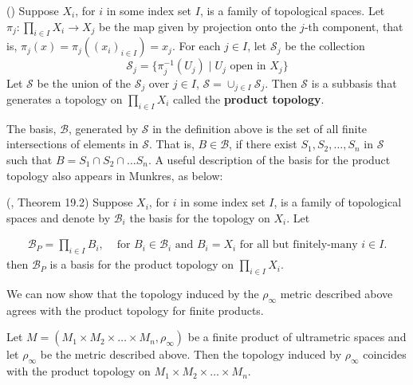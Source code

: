 \begin{definition-proposition} 
	(\cite{mun}) Suppose $X_i$, for $i$ in some index set $I$, is a family of topological spaces.  Let $\pi_j: \prod_{i \in I} X_i \rightarrow X_j$ be the map given by projection onto the $j$-th component, that is, $\pi_j (x) = \pi_j ((x_i)_{i \in I}) = x_j$. For each $j \in I$, let $\mathcal{S}_j$ be the collection \[\mathcal{S}_j = \{\pi^{-1}_j (U_j)\mid U_j \text{ open in } X_j\}\] Let $\mathcal{S}$ be the union of the $\mathcal{S}_j$ over $j \in I$, $\mathcal{S}= \cup_{j \in I} \mathcal{S}_j$. Then $\mathcal{S}$ is a subbasis that generates a topology on  $\prod_{i \in I} X_i$ called the \textbf{product topology}.\\
\end{definition-proposition}


The basis, $\mathcal{B}$, generated by $\mathcal{S}$ in the definition above is the set of all finite intersections of elements in $\mathcal{S}$. That is, $B \in \mathcal{B}$, if there exist $S_1, S_2, \ldots, S_n$ in $\mathcal{S}$ such that $B = S_1 \cap S_2 \cap \ldots S_n$.  A useful description of the basis for the product topology also appears in Munkres, as below:\\

\begin{proposition} 
	(\cite{mun}, Theorem 19.2) Suppose $X_i$, for $i$ in some index set $I$, is a family of topological spaces and denote by $\mathcal{B}_i$ the basis for the topology on $X_i$. Let 
	
	\begin{align*}
	\mathcal{B}_P = \prod_{i \in I} B_i, & \text{ for }  B_i \in \mathcal{B}_i \text { and } B_i = X_i \text{ for all but finitely-many } i \in I. 
	\end{align*}
	then $\mathcal{B}_P$ is a basis for the product topology on $\prod_{i \in I} X_i$.\\
	
\end{proposition}

We can now show that the topology induced by the $\rho_\infty$ metric described above agrees with the product topology for finite products.\\

\begin{proposition}
	Let $M=(M_{1} \times M_{2} \times \ldots \times M_{n},\rho_\infty)$ be a finite product of ultrametric spaces and let $\rho_\infty$ be the metric described above.  Then the topology induced by $\rho_\infty$ coincides with the product topology on $M_{1} \times M_{2} \times \ldots \times M_{n}$.
\end{proposition}

